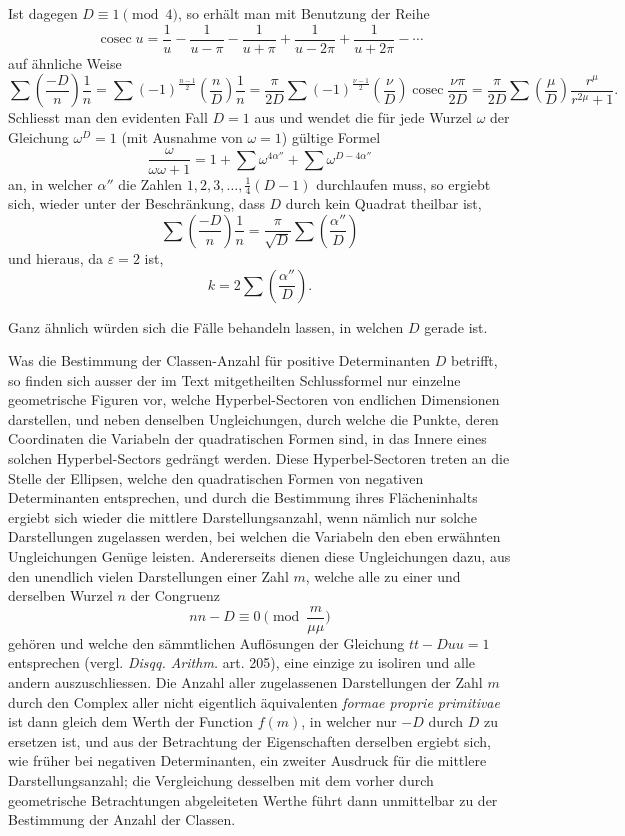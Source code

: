 \documentclass[12pt]{article}
\newcommand{\cosec}{\operatorname{cosec}}
\begin{document}
Ist dagegen \(D\equiv1\pmod4\), so erhält man mit Benutzung der Reihe
\[
\cosec u=\frac1u-\frac1{u-\pi}-\frac1{u+\pi}+\frac1{u-2\pi}+\frac1{u+2\pi}-\cdots
\]
auf ähnliche Weise
\[
\sum\left(\frac{-D}{n}\right)\frac1n
=\sum(-1)^{\frac{n-1}{2}}\left(\frac nD\right)\frac1n
=\frac{\pi}{2D}\sum(-1)^{\frac{\nu-1}{2}}\left(\frac{\nu}{D}\right)\cosec\frac{\nu\pi}{2D}
=\frac{\pi}{2D}\sum\left(\frac{\mu}{D}\right)\frac{r^\mu}{r^{2\mu}+1}.
\]
Schliesst man den evidenten Fall \(D=1\) aus und wendet die für jede Wurzel \(\omega\) der Gleichung \(\omega^D=1\) (mit Ausnahme von \(\omega=1\)) gültige Formel
\[
\frac{\omega}{\omega\omega+1}=1+\sum \omega^{4\alpha''}+\sum \omega^{D-4\alpha''}
\]
an, in welcher \(\alpha''\) die Zahlen \(1,2,3,\ldots,\frac14(D-1)\) durchlaufen muss, so ergiebt sich, wieder unter der Beschränkung, dass \(D\) durch kein Quadrat theilbar ist,
\[
\sum\left(\frac{-D}{n}\right)\frac1n
=\frac{\pi}{\sqrt D}\sum\left(\frac{\alpha''}{D}\right)
\]
und hieraus, da \(\varepsilon=2\) ist,
\[
k=2\sum\left(\frac{\alpha''}{D}\right).
\]

Ganz ähnlich würden sich die Fälle behandeln lassen, in welchen \(D\) gerade ist.

Was die Bestimmung der Classen-Anzahl für positive Determinanten \(D\) betrifft, so finden sich ausser der im Text mitgetheilten Schlussformel nur einzelne geometrische Figuren vor, welche Hyperbel-Sectoren von endlichen Dimensionen darstellen, und neben denselben Ungleichungen, durch welche die Punkte, deren Coordinaten die Variabeln der quadratischen Formen sind, in das Innere eines solchen Hyperbel-Sectors gedrängt werden. Diese Hyperbel-Sectoren treten an die Stelle der Ellipsen, welche den quadratischen Formen von negativen Determinanten entsprechen, und durch die Bestimmung ihres Flächeninhalts ergiebt sich wieder die mittlere Darstellungsanzahl, wenn nämlich nur solche Darstellungen zugelassen werden, bei welchen die Variabeln den eben erwähnten Ungleichungen Genüge leisten. Andererseits dienen diese Ungleichungen dazu, aus den unendlich vielen Darstellungen einer Zahl \(m\), welche alle zu einer und derselben Wurzel \(n\) der Congruenz
\[
nn-D\equiv0\pmod{\frac{m}{\mu\mu}}
\]
gehören und welche den sämmtlichen Auflösungen der Gleichung \(tt-Duu=1\) entsprechen (vergl. \emph{Disqq. Arithm.} art. 205), eine einzige zu isoliren und alle andern auszuschliessen. Die Anzahl aller zugelassenen Darstellungen der Zahl \(m\) durch den Complex aller nicht eigentlich äquivalenten \emph{formae proprie primitivae} ist dann gleich dem Werth der Function \(f(m)\), in welcher nur \(-D\) durch \(D\) zu ersetzen ist, und aus der Betrachtung der Eigenschaften derselben ergiebt sich, wie früher bei negativen Determinanten, ein zweiter Ausdruck für die mittlere Darstellungsanzahl; die Vergleichung desselben mit dem vorher durch geometrische Betrachtungen abgeleiteten Werthe führt dann unmittelbar zu der Bestimmung der Anzahl der Classen.
\end{document}
